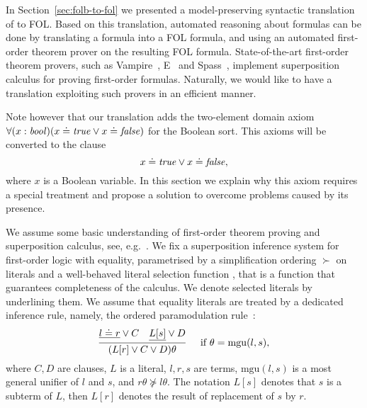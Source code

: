 In
Section~\ref{sec:folb-to-fol} we presented a model-preserving
syntactic translation of \folb{} to FOL.
Based on this translation, automated reasoning about \folb{} formulas
can be done by translating a \folb{} formula into a FOL
formula, and using an automated first-order theorem prover on the resulting FOL formula.
State-of-the-art first-order theorem provers, such as Vampire~\cite{Vampire13}, E~\cite{E13} and
Spass~\cite{Spass}, implement superposition calculus for proving first-order formulas. Naturally, we would like to have a translation exploiting such provers in an efficient manner.

Note however that our translation adds the two-element domain axiom
$\forall (x:\mathit{bool})\allowbreak(x \doteq \mathit{true} \vee x \doteq \mathit{false})$ for the Boolean sort. This axioms will be converted to the clause
\begin{equation}\label{clause:T|F}
  x \doteq \mathit{true} \vee x \doteq \mathit{false},
\end{equation}
where $x$ is a Boolean variable. In this section we
explain why this axiom requires a special treatment and propose a solution to overcome problems caused by its presence.
%

We assume some basic understanding of first-order theorem proving and superposition calculus, see, e.g.~\cite{Ganzinger01,NieuwenhuisRubio:HandbookAR:paramodulation:2001}. We fix a superposition inference system for first-order logic with equality, parametrised by a simplification ordering $\succ$ on literals and a well-behaved literal selection function \cite{Vampire13}, that is a function that guarantees completeness of the calculus. We denote selected literals by underlining them. We assume that equality literals are treated by a dedicated inference rule, namely, the ordered paramodulation rule~\cite{Robinson1969}:
\[
\infer[\quad\text{if}\ \theta = \mathrm{mgu}(l, s),]{(L[r] \vee C \vee D)\theta}%
{\underline{l \eql r} \vee C & \underline{L[s]} \vee D}
\]
where $C,D$ are clauses, $L$ is a literal, $l,r,s$ are terms, $\mathrm{mgu}(l, s)$ is a most general unifier of $l$ and $s$, and $r\theta \not\succeq l\theta$.
The notation $L[s]$ denotes that $s$ is a subterm of $L$, then $L[r]$ denotes the result of replacement of $s$ by $r$.

